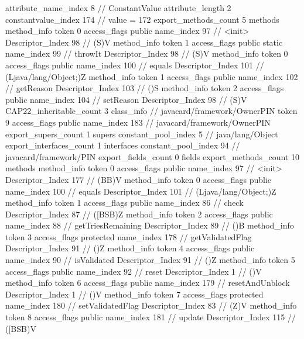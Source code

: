 {{{{{{{					attribute_name_index	8		// ConstantValue
					attribute_length	2
					constantvalue_index	174		// value = 172
				}
				}
			}
			}
			export_methods_count	5
			methods {
				method_info {
					token	0
					access_flags	public
					name_index	97		// <init>
					Descriptor_Index	98		// (S)V
				}
				method_info {
					token	1
					access_flags	public static
					name_index	99		// throwIt
					Descriptor_Index	98		// (S)V
				}
				method_info {
					token	0
					access_flags	public
					name_index	100		// equals
					Descriptor_Index	101		// (Ljava/lang/Object;)Z
				}
				method_info {
					token	1
					access_flags	public
					name_index	102		// getReason
					Descriptor_Index	103		// ()S
				}
				method_info {
					token	2
					access_flags	public
					name_index	104		// setReason
					Descriptor_Index	98		// (S)V
				}
			}
			CAP22_inheritable_count	3
		}
		class_info {		// javacard/framework/OwnerPIN
			token	9
			access_flags	public
			name_index	183		// javacard/framework/OwnerPIN
			export_supers_count	1
			supers {
				constant_pool_index	5		// java/lang/Object
			}
			export_interfaces_count	1
			interfaces {
				constant_pool_index	94		// javacard/framework/PIN
			}
			export_fields_count	0
			fields {
			}
			export_methods_count	10
			methods {
				method_info {
					token	0
					access_flags	public
					name_index	97		// <init>
					Descriptor_Index	177		// (BB)V
				}
				method_info {
					token	0
					access_flags	public
					name_index	100		// equals
					Descriptor_Index	101		// (Ljava/lang/Object;)Z
				}
				method_info {
					token	1
					access_flags	public
					name_index	86		// check
					Descriptor_Index	87		// ([BSB)Z
				}
				method_info {
					token	2
					access_flags	public
					name_index	88		// getTriesRemaining
					Descriptor_Index	89		// ()B
				}
				method_info {
					token	3
					access_flags	protected
					name_index	178		// getValidatedFlag
					Descriptor_Index	91		// ()Z
				}
				method_info {
					token	4
					access_flags	public
					name_index	90		// isValidated
					Descriptor_Index	91		// ()Z
				}
				method_info {
					token	5
					access_flags	public
					name_index	92		// reset
					Descriptor_Index	1		// ()V
				}
				method_info {
					token	6
					access_flags	public
					name_index	179		// resetAndUnblock
					Descriptor_Index	1		// ()V
				}
				method_info {
					token	7
					access_flags	protected
					name_index	180		// setValidatedFlag
					Descriptor_Index	83		// (Z)V
				}
				method_info {
					token	8
					access_flags	public
					name_index	181		// update
					Descriptor_Index	115		// ([BSB)V
}}}}}
